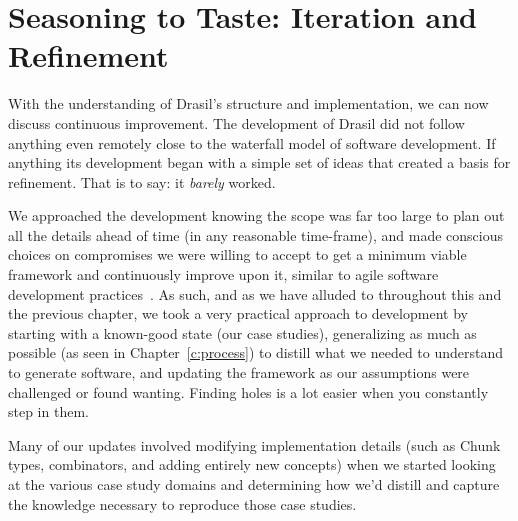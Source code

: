 

\section{Seasoning to Taste: Iteration and Refinement}
\label{sec:iterefine}

With the understanding of Drasil's structure and implementation, we can now 
discuss continuous improvement. The development of Drasil did not follow 
anything even remotely close to the waterfall model of software development. If 
anything its development began with a simple set of ideas that created a basis 
for refinement. That is to say: it \emph{barely} worked.

We approached the development knowing the scope was far too large to plan out 
all the details ahead of time (in any reasonable time-frame), and made 
conscious choices on compromises we were willing to accept to get a minimum 
viable framework and continuously improve upon it, similar to agile software 
development practices~\citep{Segal2005, CarverEtAl2007, AckroydEtAl2008, 
EasterbrookAndJohns2009}. As such, and as we have alluded to throughout this and
the previous chapter, we took a very practical approach to development by 
starting with a known-good state (our case studies), generalizing as much as 
possible (as seen in Chapter~\ref{c:process}) to distill what we needed to 
understand to generate software, and updating the framework as our assumptions 
were challenged or found wanting. Finding holes is a lot easier when you 
constantly step in them.

Many of our updates involved modifying implementation details (such as Chunk 
types, combinators, and adding entirely new concepts) when we started looking 
at the various case study domains and determining how we'd distill and capture 
the knowledge necessary to reproduce those case studies.

